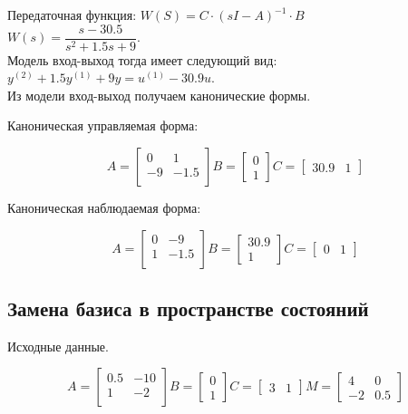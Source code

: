 \documentclass[12pt, a4paper] {ncc}
\begin{document}
		Передаточная функция:
		$W(S) = C \cdot (s I - A) ^ {-1} \cdot B $\\

		$W(s) = \dfrac {s - 30.5} {s^2 + 1.5 s + 9}$.\\

		Модель вход-выход тогда имеет следующий вид: $y^{(2)} + 1.5 y^{(1)} + 9 y = u ^{(1)} - 30.9 u$.\\

		Из модели вход-выход получаем канонические формы.

		Каноническая управляемая форма:\\
		\begin{center}
    		\[A = 
    			\begin{bmatrix}
    				0  & 1     \\
    				-9 & -1.5  \\
    			\end{bmatrix}
    		  B = 
				\begin{bmatrix}
					0 \\ 1 
				\end{bmatrix}
    		  C = 
				\begin{bmatrix}
					30.9 & 1
				\end{bmatrix}
			\]
		\end{center}

		Каноническая наблюдаемая форма:\\
		\begin{center}
    		\[A = 
    			\begin{bmatrix}
    				0 & -9 \\
    				1 & -1.5 \\
    			\end{bmatrix}
    		  B = 
				\begin{bmatrix}
					30.9 \\ 1
				\end{bmatrix}
    		  C = 
				\begin{bmatrix}
					0 & 1
				\end{bmatrix}
			\]
		\end{center}

	\subsection{Замена базиса в пространстве состояний}
		Исходные данные.
		\begin{center}
    		\[A = 
    			\begin{bmatrix}
    				0.5 & -10 \\
    				1   & -2  \\
    			\end{bmatrix}
    		  B = 
				\begin{bmatrix}
					0 \\ 1 
				\end{bmatrix}
    		  C = 
				\begin{bmatrix}
					3 & 1
				\end{bmatrix}
			  M = 
				\begin{bmatrix}
					4 & 0 \\
					-2 & 0.5 
				\end{bmatrix}
			\]
		\end{center}
\end{document}

